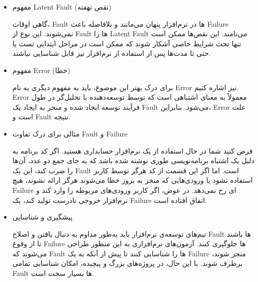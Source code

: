 \documentclass[a4paper,10pt]{article}
\begin{document}
\begin{itemize}
        \item مفهوم Latent Fault (نقص نهفته)
        
        گاهی اوقات، Fault ها در نرم‌افزار پنهان می‌مانند و بلافاصله باعث Failure نمی‌شوند. این نوع از Fault ها را Latent Fault می‌نامند. این نقص‌ها ممکن است تنها تحت شرایط خاصی آشکار شوند که ممکن است در مراحل ابتدایی تست یا حتی تا مدت‌ها پس از استفاده از نرم‌افزار نیز قابل شناسایی نباشند.

        \item مفهوم Error (خطا)

        برای درک بهتر این موضوع، باید به مفهوم دیگری به نام Error نیز اشاره کنیم. Error معمولاً به معنای اشتباهی است که توسط توسعه‌دهنده یا تحلیل‌گر در طول فرآیند توسعه ایجاد شده و منجر به ایجاد یک Fault می‌شود. بنابراین، Error علت است و Fault نتیجه.

        \item مثالی برای درک تفاوت Fault و Failure

        فرض کنید شما در حال استفاده از یک نرم‌افزار حسابداری هستید. اگر کد برنامه به دلیل یک اشتباه برنامه‌نویسی طوری نوشته شده باشد که به جای جمع دو عدد، آن‌ها را ضرب کند، این یک Fault است. اما اگر این قسمت از کد هرگز توسط کاربر استفاده نشود یا ورودی‌هایی که منجر به بروز خطا می‌شوند هرگز ارائه نشوند، هیچ Failure ای رخ نمی‌دهد. در عوض، اگر کاربر ورودی‌های مربوطه را وارد کند و نرم‌افزار خروجی نادرست تولید کند، یک Failure اتفاق افتاده است.

        \item پیشگیری و شناسایی

        تیم‌های توسعه‌ی نرم‌افزار باید به‌طور مداوم به دنبال یافتن و اصلاح Fault ها باشند تا از وقوع Failure ها جلوگیری کنند. آزمون‌های نرم‌افزاری به این منظور طراحی می‌شوند که Fault ها را شناسایی کنند تا پیش از آنکه به یک Failure منجر شوند، برطرف شوند. با این حال، در پروژه‌های بزرگ و پیچیده، امکان شناسایی تمامی Fault ها بسیار سخت است.

    \end{itemize}
\end{document}
